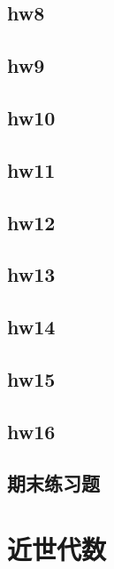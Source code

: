 \documentclass{mynote}
\begin{document}
\section{hw8}

\section{hw9}

\section{hw10}

\section{hw11}

\section{hw12}

\section{hw13}

\section{hw14}

\section{hw15}

\section{hw16}

\section{期末练习题}


\chapter{近世代数}

















\end{document}
